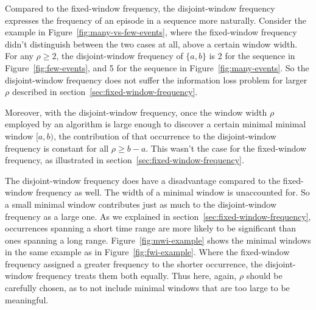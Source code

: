 Compared to the fixed-window frequency, the disjoint-window frequency expresses the frequency of an episode in a sequence more naturally. Consider the example in Figure~\ref{fig:many-vs-few-events}, where the fixed-window frequency didn't distinguish between the two cases at all, above a certain window width. For any $ \rho \geq 2 $, the disjoint-window frequency of $ \{ a, b \} $ is 2 for the sequence in Figure~\ref{fig:few-events}, and 5 for the sequence in Figure~\ref{fig:many-events}. So the disjoint-window frequency does not suffer the information loss problem for larger $ \rho $ described in section~\ref{sec:fixed-window-frequency}.

Moreover, with the disjoint-window frequency, once the window width $ \rho $ employed by an algorithm is large enough to discover a certain minimal minimal window $ [a, b) $, the contribution of that occurrence to the disjoint-window frequency is constant for all $ \rho \geq b - a $. This wasn't the case for the fixed-window frequency, as illustrated in section~\ref{sec:fixed-window-frequency}.

The disjoint-window frequency does have a disadvantage compared to the fixed-window frequency as well. The width of a minimal window is unaccounted for. So a small minimal window contributes just as much to the disjoint-window frequency as a large one. As we explained in section~\ref{sec:fixed-window-frequency}, occurrences spanning a short time range are more likely to be significant than ones spanning a long range. Figure~\ref{fig:mwi-example} shows the minimal windows in the same example as in Figure~\ref{fig:fwi-example}. Where the fixed-window frequency assigned a greater frequency to the shorter occurrence, the disjoint-window frequency treats them both equally. Thus here, again, $ \rho $ should be carefully chosen, as to not include minimal windows that are too large to be meaningful.

